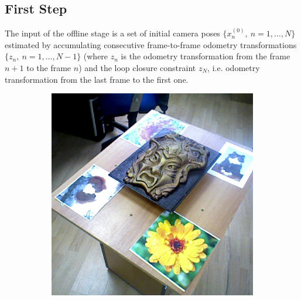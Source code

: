 \documentclass[letterpaper, 10 pt, conference]{ieeeconf}  %
\begin{document}
\subsection{First Step}

The input of the offline stage is a set of initial camera poses $\{x_n^{(0)},~n=1,\dots, N\}$ 
estimated by accumulating consecutive frame-to-frame odometry transformations 
$\{z_n,~n=1,\dots, N-1\}$  
(where $z_n$ is the odometry transformation from the frame $n+1$ to the frame $n$)
and the loop closure constraint $z_{N}$, 
i.e. odometry transformation from the last frame to the first one.

\begin{figure}[t]
	\centering
        \begin{subfigure}[b]{0.45\linewidth}
                \centering
                \includegraphics[width=\linewidth]{../models/gorgon_train.jpg}
                \caption{}
        \end{subfigure}%
        ~ %
        \begin{subfigure}[b]{0.45\linewidth}
                \centering

\end{subfigure}
\end{figure}
\end{document}
